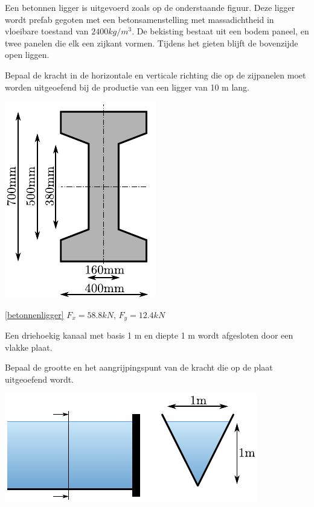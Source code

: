 \begin{toepassing}[*]
	\label{betonnenligger}
Een betonnen ligger is uitgevoerd zoals op de onderstaande figuur. Deze ligger wordt prefab gegoten met een betonsamenstelling met massadichtheid in vloeibare toestand van $2400 \unit{kg/m^3}$. De bekisting bestaat uit een bodem paneel, en twee panelen die elk een zijkant vormen. Tijdens het gieten blijft de bovenzijde open liggen.
		
Bepaal de kracht in de horizontale en verticale richting die op de zijpanelen moet worden uitgeoefend bij de productie van een ligger van 10 m lang.

	\centering
	\includegraphics{fig/hydrostatica/betonnenligger}
\end{toepassing}
\begin{antwoord}{\ref{betonnenligger}}
	$F_x = 58.8 \unit{kN}$, $F_y = 12.4 \unit{kN}$
\end{antwoord}
\begin{toepassing}
	\label{driehoekig_kanaal}
Een driehoekig kanaal met basis 1 m en diepte 1 m wordt afgesloten door een vlakke plaat.
		
Bepaal de grootte en het aangrijpingspunt van de kracht die op de plaat uitgeoefend wordt.

	\centering
	\includegraphics{fig/hydrostatica/driehoekig_kanaal}
\end{toepassing}

